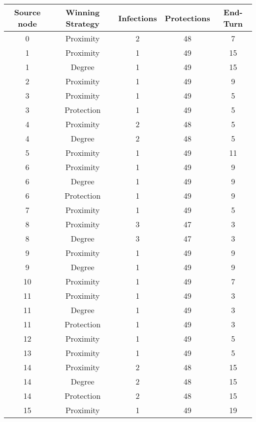 \documentclass[results.tex]{subfiles}
\begin{document}
\begin{center}
  \begin{tabular}{| c || c | c | c | c |}
    \hline
    {\bfseries Source node} & {\bfseries Winning Strategy} & {\bfseries Infections} & {\bfseries Protections} & {\bfseries End-Turn} \\  %
    \hline\hline
    0 & Proximity & 2 & 48 & 7 \\ 
    \hline
    1 & Proximity & 1 & 49 & 15 \\ 
    \hline
    1 & Degree & 1 & 49 & 15 \\ 
    \hline
    2 & Proximity & 1 & 49 & 9 \\ 
    \hline
    3 & Proximity & 1 & 49 & 5 \\ 
    \hline
    3 & Protection & 1 & 49 & 5 \\ 
    \hline
    4 & Proximity & 2 & 48 & 5 \\ 
    \hline
    4 & Degree & 2 & 48 & 5 \\ 
    \hline
    5 & Proximity & 1 & 49 & 11 \\ 
    \hline
    6 & Proximity & 1 & 49 & 9 \\ 
    \hline
    6 & Degree & 1 & 49 & 9 \\ 
    \hline
    6 & Protection & 1 & 49 & 9 \\ 
    \hline
    7 & Proximity & 1 & 49 & 5 \\ 
    \hline
    8 & Proximity & 3 & 47 & 3 \\ 
    \hline
    8 & Degree & 3 & 47 & 3 \\ 
    \hline
    9 & Proximity & 1 & 49 & 9 \\ 
    \hline
    9 & Degree & 1 & 49 & 9 \\ 
    \hline
    10 & Proximity & 1 & 49 & 7 \\ 
    \hline
    11 & Proximity & 1 & 49 & 3 \\ 
    \hline
    11 & Degree & 1 & 49 & 3 \\ 
    \hline
    11 & Protection & 1 & 49 & 3 \\ 
    \hline
    12 & Proximity & 1 & 49 & 5 \\ 
    \hline
    13 & Proximity & 1 & 49 & 5 \\ 
    \hline
    14 & Proximity & 2 & 48 & 15 \\ 
    \hline
    14 & Degree & 2 & 48 & 15 \\ 
    \hline
    14 & Protection & 2 & 48 & 15 \\ 
    \hline
    15 & Proximity & 1 & 49 & 19 \\ 

\end{tabular}
\end{center}
\end{document}
